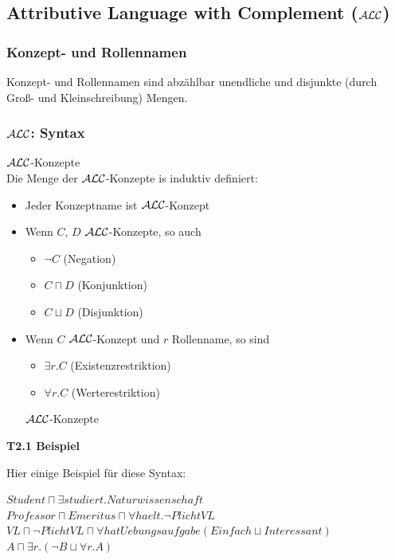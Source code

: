 \subsection{Attributive Language with Complement
($\mathcal{A}\mathcal{L}\mathcal{C}$)}\label{attributive-language-with-complement-alc}

\subsubsection{Konzept- und Rollennamen}\label{konzept--und-rollennamen}

Konzept- und Rollennamen sind abzählbar unendliche und disjunkte (durch Groß- und Kleinschreibung) Mengen.

\subsubsection{$\mathcal{A}\mathcal{L}\mathcal{C}$: Syntax}\label{alcsyntax}

\theoremstyle{definition}
\begin{definition}{$\mathcal{A}\mathcal{L}\mathcal{C}$-Konzepte} \\
  Die Menge der $\mathcal{A}\mathcal{L}\mathcal{C}$-Konzepte is induktiv definiert:
  \begin{itemize}
    \item Jeder Konzeptname ist $\mathcal{A}\mathcal{L}\mathcal{C}$-Konzept
    \item Wenn $C$, $D$ $\mathcal{A}\mathcal{L}\mathcal{C}$-Konzepte, so auch
    \begin{itemize}
      \item $\neg C$ \tabto{2cm}(Negation)
      \item $C \sqcap D$ \tabto{2cm}(Konjunktion)
      \item $C \sqcup D$ \tabto{2cm}(Disjunktion)
    \end{itemize}
    \item {Wenn $C$ $\mathcal{A}\mathcal{L}\mathcal{C}$-Konzept und $r$ Rollenname, so sind
    \begin{itemize}
      \item $\exists r.C$ \tabto{2cm}(Existenzrestriktion)
      \item $\forall r.C$ \tabto{2cm}(Werterestriktion)
    \end{itemize}
    $\mathcal{A}\mathcal{L}\mathcal{C}$-Konzepte}
  \end{itemize}
\end{definition}

\textbf{T2.1 Beispiel}

Hier einige Beispiel für diese Syntax:

\begin{center}
$Student \sqcap \exists studiert.Naturwissenschaft$ \\
$Professor \sqcap Emeritus \sqcap \forall haelt.\neg PlichtVL$ \\
$VL \sqcap \neg PlichtVL \sqcap \forall hatUebungsaufgabe(Einfach \sqcup Interessant)$ \\
$A \sqcap \exists r.(\neg B \sqcup \forall r.A)$
\end{center}

